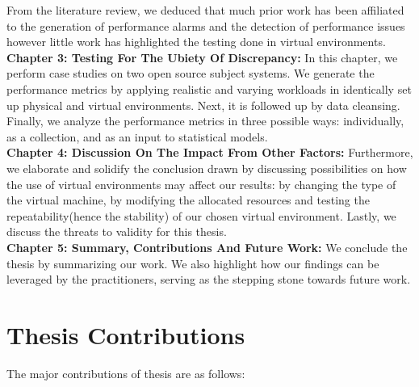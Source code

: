 From the literature review, we deduced that much prior work has been affiliated to the generation of performance alarms and the detection of performance issues however little work has highlighted the testing done in virtual environments.
\\

\noindent\textbf{Chapter 3: Testing For The Ubiety Of Discrepancy:} In this chapter, we perform case studies on two open source subject systems. We generate the performance metrics by applying realistic and varying workloads in identically set up physical and virtual environments. Next, it is followed up by data cleansing. Finally, we analyze the performance metrics in three possible ways: individually, as a collection, and as an input to statistical models. 
\\

\noindent\textbf{Chapter 4: Discussion On The Impact From Other Factors:}
Furthermore, we elaborate and solidify the conclusion drawn by discussing possibilities on how the use of virtual environments may affect our results: by changing the type of the virtual machine, by modifying the allocated resources and testing the repeatability(hence the stability) of our chosen virtual environment.
Lastly, we discuss the threats to validity for this thesis.
\\

\noindent\textbf{Chapter 5: Summary, Contributions And Future Work:}
We conclude the thesis by summarizing our work. We also highlight how our findings can be leveraged by the practitioners, serving as the stepping stone towards future work.  
\\



\section{Thesis Contributions}

The major contributions of thesis are as follows:

